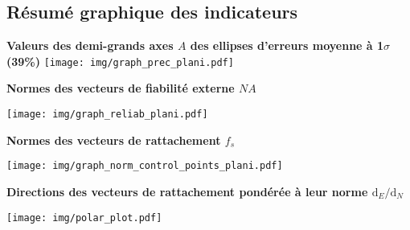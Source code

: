 \documentclass[a4paper, 9pt]{report}
\begin{document}
        \subsection{Résumé graphique des indicateurs}
            \begin{center}          
                \vspace*{26pt}
                                \large{\textbf{Valeurs des demi-grands axes $A$ des ellipses d'erreurs moyenne à 1$\sigma$ (39\%)}}                                 
                                \texttt{[image: img/graph\_prec\_plani.pdf]}
                                \vspace*{8pt}
                                
                                \textbf{Normes des vecteurs de fiabilité externe $NA$}      
                                                
                                \texttt{[image: img/graph\_reliab\_plani.pdf]}
                                
                                \vspace*{40pt} 
                                \newpage
                                \vspace*{8pt}
                                \textbf{Normes des vecteurs de rattachement $f_s$}
                                
                                \texttt{[image: img/graph\_norm\_control\_points\_plani.pdf]}
                                 
                                \vspace*{40pt} 
        
                            \textbf{Directions des vecteurs de rattachement pondérée à leur norme $\mathrm{d}_E/\mathrm{d}_N$}
        
                                \texttt{[image: img/polar\_plot.pdf]}
                                \vspace*{8pt}                
            \end{center}
                      
\end{document}
